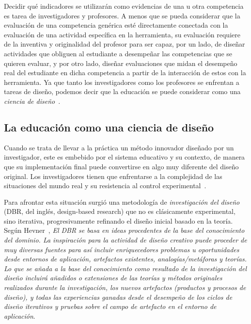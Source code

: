 Decidir qué indicadores se utilizarán como evidencias de una u otra competencia es tarea de investigadores y profesores. A menos que se pueda considerar que la evaluación de una competencia genérica esté directamente conectada con la evaluación de una actividad específica en la herramienta, su evaluación requiere de la inventiva y originalidad del profesor para ser capaz, por un lado, de diseñar actividades que obliguen al estudiante a desempeñar las competencias que se quieren evaluar, y por otro lado, diseñar evaluaciones que midan el desempeño real del estudiante en dicha competencia a partir de la interacción de estos con la herramienta. Ya que tanto los investigadores como los profesores se enfrentan a tareas de diseño, podemos decir que la educación se puede considerar como una \emph{ciencia de diseño}~\cite{laurillard2012teaching}. 

\subsection*{La educación como una ciencia de diseño}
\label{sec:dbr}

Cuando se trata de llevar a la práctica un método innovador diseñado por un investigador, este es embebido por el sistema educativo y su contexto, de manera que su implementación final puede convertirse en algo muy diferente del diseño original. Los investigadores tienen que enfrentarse a la complejidad de las situaciones del mundo real y su resistencia al control experimental~\cite{collins2004design}. 

Para afrontar esta situación surgió una metodología de \emph{investigación del diseño} (DBR, del inglés, design-based research) que no es clásicamente experimental, sino iterativa, progresivamente refinando el diseño inicial basado en la teoría. Según Hevner~\cite{hevner2009interview}, \emph{El DBR se basa en ideas procedentes de la base del conocimiento del dominio. La inspiración para la actividad de diseño creativo puede proceder de muy diversas fuentes para así incluir enriquecedores problemas u oportunidades desde entornos de aplicación, artefactos existentes, analogías/metáforas y teorías. Lo que se añada a la base del conocimiento como resultado de la investigación del diseño incluirá añadidos o extensiones de las teorías y métodos originales realizados durante la investigación, los nuevos artefactos (productos y procesos de diseño), y todas las experiencias ganadas desde el desempeño de los ciclos de diseño iterativos y pruebas sobre el campo de artefacto en el entorno de aplicación}.


